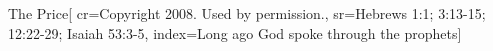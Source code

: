 {The Price}[
    cr={Copyright 2008.  Used by permission.},
    sr={Hebrews 1:1; 3:13-15; 12:22-29; Isaiah 53:3-5},
    index={Long ago God spoke through the prophets}]